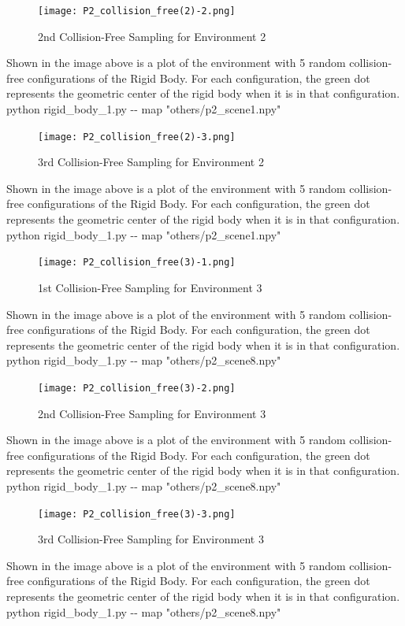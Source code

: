 \documentclass{article}
\begin{document}
\newpage 
\begin{figure}[h!]
	\texttt{[image: P2\_collision\_free(2)-2.png]}
	\centering
	\caption{2nd Collision-Free Sampling for Environment 2}
	\label{P2_collision_free(2)-2.png}
\end{figure}
Shown in the image above is a plot of the environment with 5 random collision-free configurations of the Rigid Body. For each configuration, the green dot represents the geometric center of the rigid body when it is in that configuration. 
python rigid\_body\_1.py -\-- map "others/p2\_scene1.npy"

\newpage 
\begin{figure}[h!]
	\texttt{[image: P2\_collision\_free(2)-3.png]}
	\centering
	\caption{3rd Collision-Free Sampling for Environment 2}
	\label{P2_collision_free(2)-3.png}
\end{figure}
Shown in the image above is a plot of the environment with 5 random collision-free configurations of the Rigid Body. For each configuration, the green dot represents the geometric center of the rigid body when it is in that configuration. 
python rigid\_body\_1.py -\-- map "others/p2\_scene1.npy"

\newpage 
\begin{figure}[h!]
	\texttt{[image: P2\_collision\_free(3)-1.png]}
	\centering
	\caption{1st Collision-Free Sampling for Environment 3}
	\label{P2_collision_free(3)-1.png}
\end{figure}
Shown in the image above is a plot of the environment with 5 random collision-free configurations of the Rigid Body. For each configuration, the green dot represents the geometric center of the rigid body when it is in that configuration. 
python rigid\_body\_1.py -\-- map "others/p2\_scene8.npy"

\newpage 
\begin{figure}[h!]
	\texttt{[image: P2\_collision\_free(3)-2.png]}
	\centering
	\caption{2nd Collision-Free Sampling for Environment 3}
	\label{P2_collision_free(3)-2.png}
\end{figure}
Shown in the image above is a plot of the environment with 5 random collision-free configurations of the Rigid Body. For each configuration, the green dot represents the geometric center of the rigid body when it is in that configuration. 
python rigid\_body\_1.py -\-- map "others/p2\_scene8.npy"

\newpage 
\begin{figure}[h!]
	\texttt{[image: P2\_collision\_free(3)-3.png]}
	\centering
	\caption{3rd Collision-Free Sampling for Environment 3}
	\label{P2_collision_free(3)-3.png}
\end{figure}
Shown in the image above is a plot of the environment with 5 random collision-free configurations of the Rigid Body. For each configuration, the green dot represents the geometric center of the rigid body when it is in that configuration. 
python rigid\_body\_1.py -\-- map "others/p2\_scene8.npy"
\end{document}
